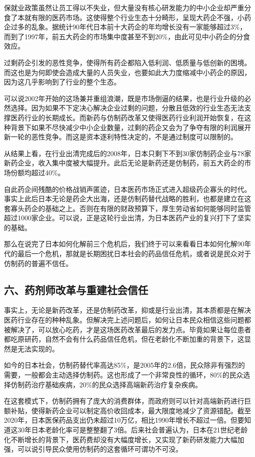 保就业政策虽然让员工得以不失业，但大量没有核心研发能力的中小企业却严重分食了本就有限的医药市场。这使得整个行业生态十分畸形，呈现大药企不强，小药企过多的乱象。据统计90年代日本前十大药企的年均增长没有一家能够超过3\%，而到了1997年，前五大药企的市场集中度甚至不到20\%，由此可见中小药企的分食效应。

过剩药企引发的恶性竞争，使得所有药企都陷入低利润、低质量与低创新的困境。而这也是为何即使会造成大量的人员失业，也要如此大力度缩减中小药企的原因，因为这几乎影响到了行业的整个生态。

可以说2002年开始的这场兼并重组浪潮，既是市场倒逼的结果，也是行业升级的必然选择。因为如果不下定决心解决企业过剩的问题，分散且低效的行业生态无法支撑医药行业的长期成长。而新药与仿制药改革又使得医药行业利润开始恢复，在这种背景下如果不尽快减少中小企业数量，过剩的药企又会为了争夺有限的利润展开新一轮的恶性竞争。而这是资本逐利特性决定的，不是通过制度可以限制的。

从结果上看，在行业出清完成后的2008年，日本只剩下不到30家仿制药企业与78家新药企业，收入集中度被大幅提升。此后无论是新药还是仿制药，前五大药企的市场份额均超过40\%。

自此药企间残酷的价格战销声匿迹，日本医药市场正式进入超级药企寡头的时代。事实上此后日本无论是药企大出海，还是仿制药替代战略的胜利，也都是建立在这套寡头药企的基础之上。否则在有限的财政预算下，厚生劳动省如何能够同时监管超过1000家企业。可以说，正是这轮行业出清，为日本医药产业的复兴打下了坚实的基础。

那么在说完了日本如何化解前三个危机后，我们终于可以来看看日本如何化解90年代的最后一个危机，那就是长期困扰日本社会的药品信任危机，或者说是民众对于仿制药的普遍不信任。

\subsection{六、药剂师改革与重建社会信任}

事实上，无论是新药改革，还是仿制药改革，抑或是行业出清，其本质都是在解决医药行业存在的种种乱象。但解决完上述问题后，如何让日本民众相信这些问题都被解决了，可以放心吃药，才是这场医药改革最后的发力点。毕竟如果让每位患者都吃原研药，自然不会有什么药品信任危机，但在老龄化不断加重的背景下，这显然是无法实现的。

如今的日本社会，仿制药替代率高达85\%，是2005年的2.6倍，民众除非有强烈的需要，一般都会主动选择仿制药。这也形成了一个非常良性的循环，80\%的民众选择仿制药治疗基础疾病，20\%的民众选择高端新药治疗复杂疾病。

在这套模式下，仿制药拥有了庞大的消费群体，而政府则可以针对高端新药进行巨额补贴，使得新药企业可以制定高价收回成本，最大限度地减少了资源错配。截至2020年，日本医保药品支出仍未超过10万亿，相比1990年增长不超过一倍。但要知道这30年日本老龄化率可是整整翻了3倍。后来社会普遍认为，日本在21世纪老龄化不断增长的背景下，医药费却没有大幅度增长，又实现了新药研发能力大幅加强，可以说引导民众使用仿制药的这套循环可谓功不可没。

